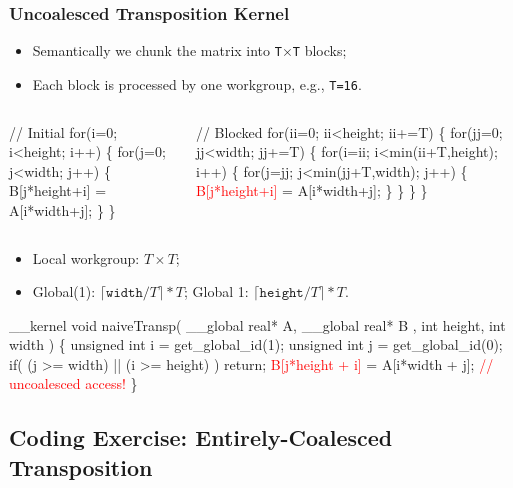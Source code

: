 \documentclass{beamer}
\newcommand{\red}[1]{\textcolor{Red}{{#1}}}
\newcommand{\emp}[1]{\textcolor{DikuRed}{ #1}}
\newcommand{\emphh}[1]{\textcolor{CosGreen}{ #1}}
\begin{document}
\begin{frame}[fragile,t]
  \frametitle{Uncoalesced Transposition Kernel} 

\begin{itemize}
    \item Semantically we chunk the matrix into {\tt T$\times$T} blocks;
    \item Each block is processed by one workgroup, e.g., {\tt T=16}.
\end{itemize}

\begin{columns}
\begin{colorcode}[fontsize=\scriptsize]
// Initial
for(i=0; i<height; i++) \{    
  for(j=0; j<width; j++) \{ 
    B[j*height+i] =
           A[i*width+j];
  \}
\}
\end{colorcode}
\begin{colorcode}[fontsize=\scriptsize]
// Blocked
\emp{for(ii=0; ii<height; ii+=T) \{}
  \emp{for(jj=0; jj<width; jj+=T) \{}
    \emphh{for(i=ii; i<min(ii+T,height); i++) \{}
      \emphh{for(j=jj; j<min(jj+T,width); j++) \{}
        \red{B[j*height+i]} = A[i*width+j];
\} \} \} \}
\end{colorcode}
\end{columns}

\begin{itemize}
\item Local workgroup: $T\times T$; 
\item Global(1): $\lceil \texttt{width}/T \rceil * T$; Global 1: $\lceil \texttt{height}/T \rceil * T$.
\end{itemize}
\pause

\begin{colorcode}[fontsize=\scriptsize]
__kernel void naiveTransp( __global real* A, __global real* B
                         , int height, int width ) \{
    unsigned int i = get_global_id(1);
    unsigned int j = get_global_id(0); 
    if( (j >= width) || (i >= height) ) return;
    \red{B[j*height + i]} = A[i*width + j];  \red{// uncoalesced access!}
\}

\end{colorcode}

\end{frame}

\subsection{Coding Exercise: Entirely-Coalesced Transposition}
\end{document}
